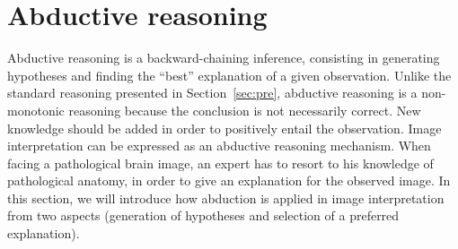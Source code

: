 \documentclass{article}
\begin{document}
\section{Abductive reasoning}\label{sec:abd}
Abductive reasoning is a backward-chaining inference, consisting in generating hypotheses and finding the ``best'' explanation of a given observation.
Unlike the standard reasoning presented in Section~\ref{sec:pre}, abductive reasoning is a non-monotonic reasoning because the conclusion is not necessarily correct.
New knowledge should be added in order to positively entail the observation.
Image interpretation can be expressed as an abductive reasoning  mechanism.
When facing a pathological brain image, an expert has to resort to his knowledge of pathological anatomy, in order to give  an explanation for the observed image. 
In this section, we will introduce how abduction is applied in image interpretation from two aspects (generation of hypotheses and selection of a preferred explanation).

\end{document}
